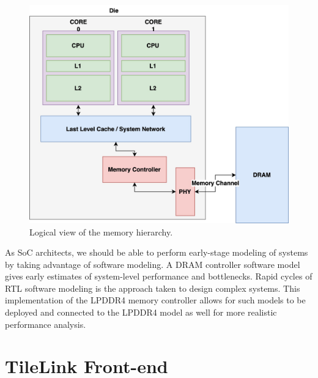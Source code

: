 \begin{figure}[b]
  \includegraphics[scale=.15]{images/soc.jpg}
  \caption{Logical view of the memory hierarchy.}
  \label{fig:soc}
\end{figure}


As SoC architects, we should be able to perform early-stage modeling of systems by taking advantage of software modeling. A DRAM controller software model gives early estimates of system-level performance and bottlenecks. Rapid cycles of RTL software modeling is the approach taken to design complex systems. This implementation of the LPDDR4 memory controller allows for such models to be deployed and connected to the LPDDR4 model as well for more realistic performance analysis.
\section{TileLink Front-end}


